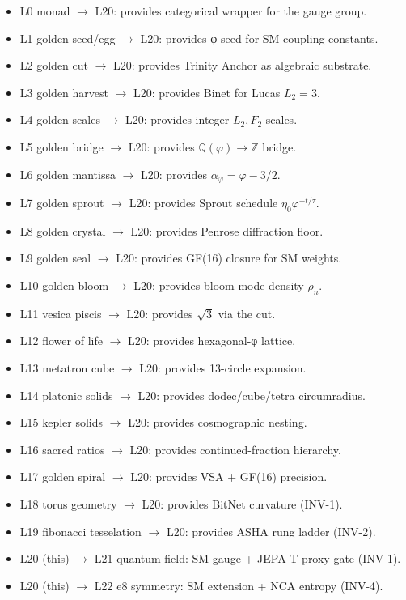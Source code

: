 \begin{itemize}
  \item L0 monad $\to$ L20: provides categorical wrapper for the gauge group.
  \item L1 golden seed/egg $\to$ L20: provides φ-seed for SM coupling constants.
  \item L2 golden cut $\to$ L20: provides Trinity Anchor as algebraic substrate.
  \item L3 golden harvest $\to$ L20: provides Binet for Lucas $L_{2}=3$.
  \item L4 golden scales $\to$ L20: provides integer $L_{2}, F_{2}$ scales.
  \item L5 golden bridge $\to$ L20: provides $\mathbb{Q}(\varphi) \to \mathbb{Z}$ bridge.
  \item L6 golden mantissa $\to$ L20: provides $\alpha_{\varphi} = \varphi - 3/2$.
  \item L7 golden sprout $\to$ L20: provides Sprout schedule $\eta_{0} \varphi^{-t/\tau}$.
  \item L8 golden crystal $\to$ L20: provides Penrose diffraction floor.
  \item L9 golden seal $\to$ L20: provides GF(16) closure for SM weights.
  \item L10 golden bloom $\to$ L20: provides bloom-mode density $\rho_{n}$.
  \item L11 vesica piscis $\to$ L20: provides $\sqrt 3$ via the cut.
  \item L12 flower of life $\to$ L20: provides hexagonal-φ lattice.
  \item L13 metatron cube $\to$ L20: provides 13-circle expansion.
  \item L14 platonic solids $\to$ L20: provides dodec/cube/tetra circumradius.
  \item L15 kepler solids $\to$ L20: provides cosmographic nesting.
  \item L16 sacred ratios $\to$ L20: provides continued-fraction hierarchy.
  \item L17 golden spiral $\to$ L20: provides VSA + GF(16) precision.
  \item L18 torus geometry $\to$ L20: provides BitNet curvature (INV-1).
  \item L19 fibonacci tesselation $\to$ L20: provides ASHA rung ladder (INV-2).
  \item L20 (this) $\to$ L21 quantum field: SM gauge + JEPA-T proxy gate (INV-1).
  \item L20 (this) $\to$ L22 e8 symmetry: SM extension + NCA entropy (INV-4).

\end{itemize}
